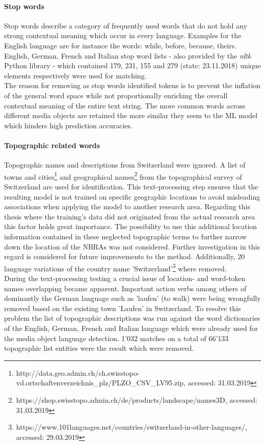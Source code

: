 \paragraph*{Stop words}
Stop words describe a category of frequently used words that do not hold any strong contextual meaning which occur in every language. Examples for the English language are for instance the words: while, before, because, theirs.\\
English, German, French and Italian stop word lists - also provided by the \textit{nltk} Python library - which contained 179, 231, 155 and 279 (state: 23.11.2018) unique elements respectively were used for matching.\\
The reason for removing as stop words identified tokens is to prevent the inflation of the general word space while not proportionally enriching the overall contextual meaning of the entire text string. The more common words across different media objects are retained the more similar they seem to the ML model which hinders high prediction accuracies.

\paragraph*{Topographic related words}
Topographic names and descriptions from Switzerland were ignored. A list of towns and cities\footnote{http://data.geo.admin.ch/ch.swisstopo-vd.ortschaftenverzeichnis\_plz/PLZO\_CSV\_LV95.zip, accessed: 31.03.2019} and geographical names\footnote{https://shop.swisstopo.admin.ch/de/products/landscape/names3D, accessed: 31.03.2019} from the topographical survey of Switzerland are used for identification. This text-processing step ensures that the resulting model is not trained on specific geographic locations to avoid misleading associations when applying the model to another research area. Regarding this thesis where the training's data did not originated from the actual research area this factor holds great importance. 
The possibility to use this additional location information contained in these neglected topographic terms to further narrow down the location of the NBRAs was not considered. Further investigation in this regard is considered for future improvements to the method. Additionally, 20 language variations of the country name 'Switzerland'\footnote{https://www.101languages.net/countries/switzerland-in-other-languages/, accessed: 29.03.2019} where removed. \\
During the text-processing testing a crucial issue of location- and word-token names overlapping became apparent. Important action verbs among others of dominantly the German language such as 'laufen' (to walk) were being wrongfully removed based on the existing town 'Laufen' in Switzerland. To resolve this problem the list of topographic descriptions was run against the word dictionaries of the English, German, French and Italian language which were already used for the media object language detection. 1'032 matches on a total of 66'133 topographic list entities were the result which were removed.

